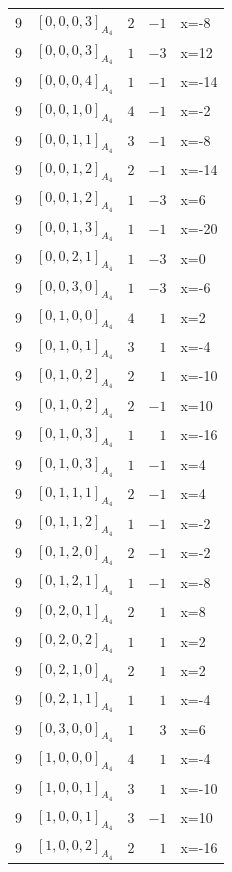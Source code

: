 \documentclass[11pt]{article}
\newcommand{\Dynkin}[1]{#1}
\begin{document}
\begin{longtable}{r l r r l}
9 & $\Dynkin{[0,0,0,3]_{A_4}}$ & $2$ & $-1$ & x=-8\\
9 & $\Dynkin{[0,0,0,3]_{A_4}}$ & $1$ & $-3$ & x=12\\
9 & $\Dynkin{[0,0,0,4]_{A_4}}$ & $1$ & $-1$ & x=-14\\
9 & $\Dynkin{[0,0,1,0]_{A_4}}$ & $4$ & $-1$ & x=-2\\
9 & $\Dynkin{[0,0,1,1]_{A_4}}$ & $3$ & $-1$ & x=-8\\
9 & $\Dynkin{[0,0,1,2]_{A_4}}$ & $2$ & $-1$ & x=-14\\
9 & $\Dynkin{[0,0,1,2]_{A_4}}$ & $1$ & $-3$ & x=6\\
9 & $\Dynkin{[0,0,1,3]_{A_4}}$ & $1$ & $-1$ & x=-20\\
9 & $\Dynkin{[0,0,2,1]_{A_4}}$ & $1$ & $-3$ & x=0\\
9 & $\Dynkin{[0,0,3,0]_{A_4}}$ & $1$ & $-3$ & x=-6\\
9 & $\Dynkin{[0,1,0,0]_{A_4}}$ & $4$ & $1$ & x=2\\
9 & $\Dynkin{[0,1,0,1]_{A_4}}$ & $3$ & $1$ & x=-4\\
9 & $\Dynkin{[0,1,0,2]_{A_4}}$ & $2$ & $1$ & x=-10\\
9 & $\Dynkin{[0,1,0,2]_{A_4}}$ & $2$ & $-1$ & x=10\\
9 & $\Dynkin{[0,1,0,3]_{A_4}}$ & $1$ & $1$ & x=-16\\
9 & $\Dynkin{[0,1,0,3]_{A_4}}$ & $1$ & $-1$ & x=4\\
9 & $\Dynkin{[0,1,1,1]_{A_4}}$ & $2$ & $-1$ & x=4\\
9 & $\Dynkin{[0,1,1,2]_{A_4}}$ & $1$ & $-1$ & x=-2\\
9 & $\Dynkin{[0,1,2,0]_{A_4}}$ & $2$ & $-1$ & x=-2\\
9 & $\Dynkin{[0,1,2,1]_{A_4}}$ & $1$ & $-1$ & x=-8\\
9 & $\Dynkin{[0,2,0,1]_{A_4}}$ & $2$ & $1$ & x=8\\
9 & $\Dynkin{[0,2,0,2]_{A_4}}$ & $1$ & $1$ & x=2\\
9 & $\Dynkin{[0,2,1,0]_{A_4}}$ & $2$ & $1$ & x=2\\
9 & $\Dynkin{[0,2,1,1]_{A_4}}$ & $1$ & $1$ & x=-4\\
9 & $\Dynkin{[0,3,0,0]_{A_4}}$ & $1$ & $3$ & x=6\\
9 & $\Dynkin{[1,0,0,0]_{A_4}}$ & $4$ & $1$ & x=-4\\
9 & $\Dynkin{[1,0,0,1]_{A_4}}$ & $3$ & $1$ & x=-10\\
9 & $\Dynkin{[1,0,0,1]_{A_4}}$ & $3$ & $-1$ & x=10\\
9 & $\Dynkin{[1,0,0,2]_{A_4}}$ & $2$ & $1$ & x=-16\\

\end{longtable}
\end{document}
